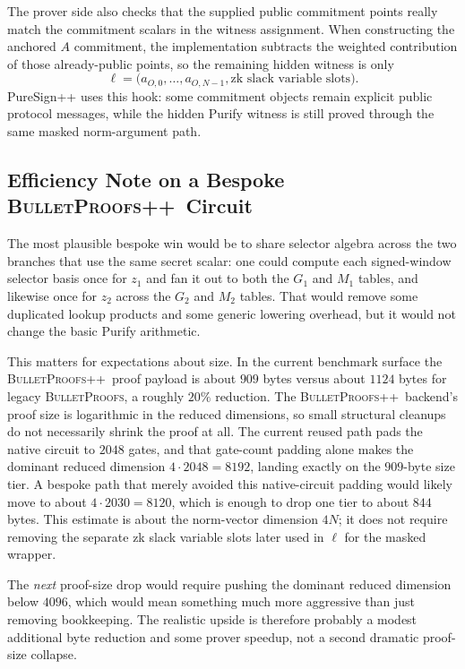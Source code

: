 \documentclass[11pt]{article}
\DeclareRobustCommand{\bp}{{\normalfont\scshape BulletProofs}}
\DeclareRobustCommand{\bppp}{{\normalfont\scshape BulletProofs++}}
\begin{document}
The prover side also checks that the supplied public commitment points really match the commitment
scalars in the witness assignment. When constructing the anchored $A$ commitment, the implementation subtracts
the weighted contribution of those already-public points, so the remaining hidden witness is only
\[
\ell = \bigl(a_{O,0}, \ldots, a_{O,N-1}, \text{zk slack variable slots}\bigr).
\]
PureSign++ uses this hook: some commitment objects remain explicit public
protocol messages, while the hidden Purify witness is still proved through the same masked
norm-argument path.

\subsection{Efficiency Note on a Bespoke \bppp\ Circuit}

The most plausible bespoke win would be to share selector algebra across the two branches that use
the same secret scalar: one could compute each signed-window selector basis once for $z_1$ and fan
it out to both the $G_1$ and $M_1$ tables, and likewise once for $z_2$ across the $G_2$ and $M_2$
tables. That would remove some duplicated lookup products and some generic lowering overhead, but it
would not change the basic Purify arithmetic.

This matters for expectations about size. In the current benchmark surface the \bppp\ proof payload
is about $909$ bytes versus about $1124$ bytes for legacy \bp, a roughly $20\%$ reduction. The
\bppp\ backend's proof size is logarithmic in the reduced dimensions, so small structural cleanups
do not necessarily shrink the proof at all. The current reused path pads the native circuit to
$2048$ gates, and that gate-count padding alone makes the dominant reduced dimension
$4 \cdot 2048 = 8192$, landing exactly on the $909$-byte size tier. A bespoke path that merely
avoided this native-circuit padding would likely move to about $4 \cdot 2030 = 8120$, which is
enough to drop one tier to about $844$ bytes. This estimate is about the norm-vector dimension $4N$;
it does not require removing the separate zk slack variable slots later used in $\ell$ for the
masked wrapper.

The \emph{next} proof-size drop would require pushing the dominant reduced dimension below $4096$,
which would mean something much more aggressive than just removing bookkeeping. The realistic upside
is therefore probably a modest additional byte reduction and some prover speedup, not a second
dramatic proof-size collapse.
\end{document}
